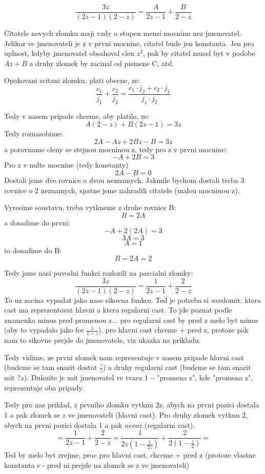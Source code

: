 $$\frac{3z}{(2z-1)(2-z)} = \frac{A}{2z-1}+\frac{B}{2-z}$$

Citatele novych zlomku maji vzdy o stupen mensi mocninu nez jmenovatel. Jelikoz ve jmenovateli je z v prvni mocnine, citatel bude jen konstanta. Jen pro uplnost, kdyby jmenovatel obsahoval clen $z^2$, pak by citatel musel byt v podobe $Az+B$ a druhy zlomek by zacinal od pismene C, atd.

Opakovani scitani zlomku, plati obecne, ze:
$$\frac{c_1}{j_1}+\frac{c_2}{j_2} = \frac{c_1\cdot j_2 + c_2\cdot j_1}{j_1 \cdot j_2}$$

Tedy v nasem pripade chceme, aby platilo, ze:
$$A(2-z)+B(2z-1) = 3z$$
Tedy roznasobime:
$$2A - Az + 2Bz - B = 3z$$
a porovname cleny se stejnou mocninou z, tedy pro z v prvni mocnine:
$$-A + 2B = 3$$
Pro z v nulte mocnine (tedy konstanty)
$$2A-B = 0$$
Dostali jsme dve rovnice o dvou neznamych. Jakmile bychom dostali treba 3 rovnice o 2 neznamych, spatne jsme nahradili citatele (malou mocninou z). 

Vyresime soustavu, treba vytkneme z druhe rovnice B:
$$B = 2A$$
a dosadime do prvni:
$$-A + 2(2A) = 3$$
$$3A = 3$$
$$A = 1$$
to dosadime do B:
$$B = 2A = 2$$

Tedy jsme nasi puvodni funkci rozlozili na parcialni zlomky:
$$\frac{3z}{(2z-1)(2-z)} = \frac{1}{2z-1}+\frac{2}{2-z}$$
To uz zacina vypadat jako nase sikovna funkce. Ted je potreba si uvedomit, ktera cast ma reprezentovat hlavni a ktera regularni cast. To jde poznat podle znamenka minus pred promenou z... pro regularni cast by pred z melo byt minus (aby to vypadalo jako fce $\frac{1}{1-z}$), pro hlavni cast chceme + pred z, protoze pak nam to sikovne prejde do jmenovatele, viz ukazka na prikladu.

Tedy vidime, ze prvni zlomek nam reprezentuje v nasem pripade hlavni cast (budeme se tam snazit dostat $\frac{?}{z}$) a druhy regularni cast (budeme se tam snazit mit $?z$). Dulezite je mit jmenovatel ve tvaru $1-$"promena z", kde "promena z", reprezentuje oba pripady. 

Tedy pro nas priklad, z prvniho zlomku vytknu 2z, abych na prvni pozici dostala $1$ a pak zlomek se $z$ ve jmenovateli (hlavni cast). Pro druhy zlomek vytknu $2$, abych na prvni pozici dostala $1$ a pak $neco \dot z$ (regularni cast).
$$ = \frac{1}{2z-1}+\frac{2}{2-z} = \frac{1}{2z \left( 1 - \frac{1}{2z}\right)}+\frac{2}{2 \left( 1-\frac{z}{2}\right)} =$$
Ted by melo byt zrejme, proc pro hlavni cast, chceme + pred z (protoze vlastne konstanta s - pred ni prejde na zlomek se z ve jmenovateli)

